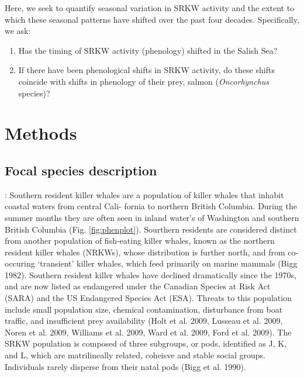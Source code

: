 \documentclass{article}
\begin{document}
\par Here, we seek to quantify seasonal variation in SRKW activity and the extent to which these seasonal patterns have shifted over the past four decades.  %
Specifically, we ask:
\begin{enumerate}
\item Has the timing of SRKW activity (phenology) shifted in the Salish Sea? 
\item If there have been phenological shifts in SRKW activity, do these shifts coincide with shifts in phenology of their prey, salmon (\emph{Oncorhynchus} species)?
\end{enumerate}

\section* {Methods}
\subsection*{Focal species description}:
Southern resident killer whales are a population of killer whales that inhabit coastal waters from central Cali-
fornia to northern British Columbia.  During the summer months they are often seen in inland water's of Washington and southern British Columbia (Fig. \ref{fig:phenplot}). Sourthern residents are considered distinct from another population of fish-eating killer whales, known as the northern resident killer whales (NRKWs), whose distribution is further north, and from co-occuring `transient' killer whales, which feed primarily on marine mammals (Bigg 1982). Southern resident killer whales have declined dramatically since the 1970s, and are now listed as endangered under the Canadian Species at Risk Act (SARA) and the US Endangered Species Act (ESA). Threats to this population include small population size, chemical contamination, disturbance from boat traffic, and insufficient prey availability (Holt et al. 2009, Lusseau et al. 2009, Noren et al. 2009, Williams et al. 2009, Ward et al. 2009, Ford et al. 2009). The SRKW population is composed of three subgroups, or pods, identified as J, K, and L, which are matrilineally related, coheisve and stable social groups. Individuals rarely disperse from their natal pods (Bigg et al. 1990).
\end{document}
